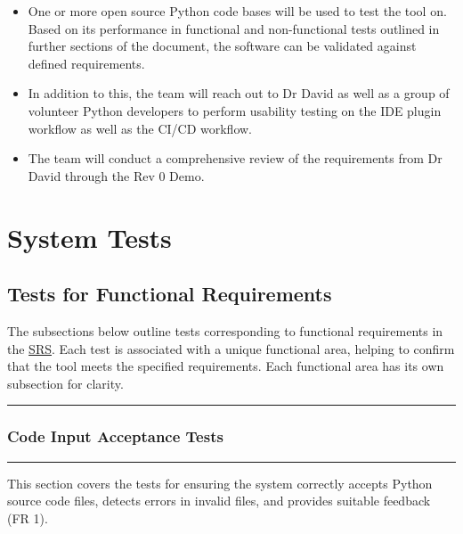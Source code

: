 \documentclass[12pt, titlepage]{article}
\newcommand{\SRS}{\href{https://github.com/ssm-lab/capstone--source-code-optimizer/blob/main/docs/SRS/SRS.pdf}{SRS}}
\newcommand{\colorrule}{\textcolor{BlueViolet}{\rule{\linewidth}{2pt}}}
\begin{document}
\begin{itemize}
    \item One or more open source Python code bases will be used to test the tool on. Based on its performance in functional and non-functional tests outlined in further sections of the document, the software can be validated against defined requirements.
    \item In addition to this, the team will reach out to Dr David as well as a group of volunteer Python developers to perform usability testing on the IDE plugin workflow as well as the CI/CD workflow.
    \item The team will conduct a comprehensive review of the requirements from Dr David through the Rev 0 Demo.
\end{itemize}

\section{System Tests}

\subsection{Tests for Functional Requirements}

The subsections below outline tests corresponding to functional 
requirements in the \SRS \cite{SRS}. Each test is associated with a unique functional area, helping to confirm that the tool meets the specified requirements. Each functional area has its own subsection for clarity.

\noindent
\colorrule

\subsubsection{Code Input Acceptance Tests}
\colorrule

\medskip

\noindent
This section covers the tests for ensuring the system correctly accepts Python source code files, detects errors in invalid files, and provides suitable feedback (FR 1).
\end{document}
